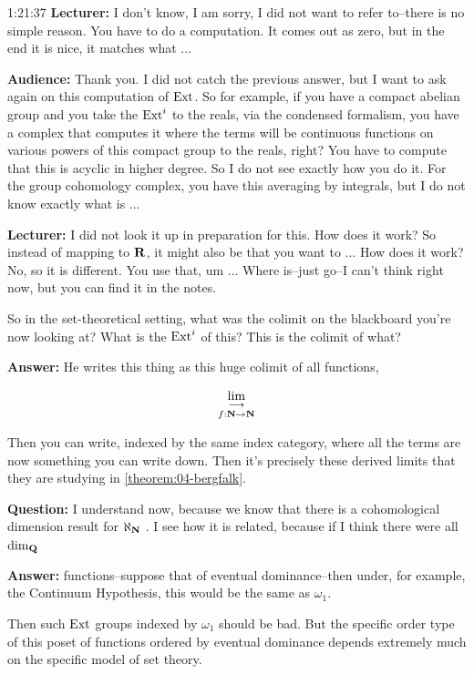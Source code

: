 \begin{unfinished}{1:21:37}
%
\textbf{Lecturer:} I don't know, I am sorry, I did not want to refer to--there is no simple reason. You have to do a computation. It comes out as zero, but in the end it is nice, it matches what ...

%
\textbf{Audience:} Thank you. I did not catch the previous answer, but I want to ask again on this computation of $\operatorname{Ext}$. So for example, if you have a compact abelian group and you take the $\operatorname{Ext}^i$ to the reals, via the condensed formalism, you have a complex that computes it where the terms will be continuous functions on various powers of this compact group to the reals, right? You have to compute that this is acyclic in higher degree. So I do not see exactly how you do it. For the group cohomology complex, you have this averaging by integrals, but I do not know exactly what is ...

% 
\textbf{Lecturer:} I did not look it up in preparation for this. How does it work? So instead of mapping to $\mathbf R$, it might also be that you want to ... How does it work? No, so it is different. You use that, um ...
Where is--just go--I can't think right now, but you can find it in the notes.


 
So in the set-theoretical setting, what was the colimit on the blackboard you're now looking at? What is the $\operatorname{Ext}^i$ of this? This is the colimit of what?

\textbf{Answer:} He writes this thing as this huge colimit of all functions, 

\begin{align*}
\mathop{\operatorname*{lim}\limits_{\longrightarrow}}\limits_{f: \mathbf N \to \mathbf N}
\end{align*}

Then you can write, indexed by the same index category, where all the terms are now something you can write down. Then it's precisely these derived limits that they are studying in \ref{theorem:04-bergfalk}.

\textbf{Question:} I understand now, because we know that there is a cohomological dimension result for $\aleph_\mathbf N$ . I see how it is related, because if I think there were all $\dim_\mathbf Q$ 

\textbf{Answer:} functions--suppose that of eventual dominance--then under, for example, the Continuum Hypothesis, this would be the same as $\omega_1$.

Then such $\operatorname{Ext}$ groups indexed by $\omega_1$ should be bad. But the specific order type of this poset of functions  ordered by eventual dominance depends extremely much on the specific model of set theory.

\end{unfinished}